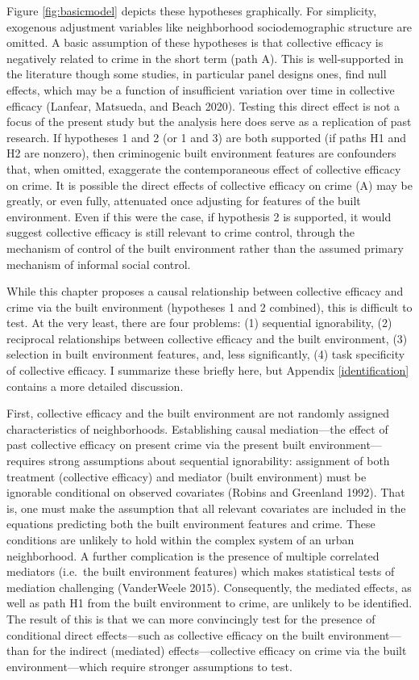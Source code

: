 \documentclass [11pt, proquest] {uwthesis}[2015/03/03]
\begin{document}
Figure \ref{fig:basicmodel} depicts these hypotheses graphically. For simplicity, exogenous adjustment variables like neighborhood sociodemographic structure are omitted. A basic assumption of these hypotheses is that collective efficacy is negatively related to crime in the short term (path A). This is well-supported in the literature though some studies, in particular panel designs ones, find null effects, which may be a function of insufficient variation over time in collective efficacy (Lanfear, Matsueda, and Beach 2020). Testing this direct effect is not a focus of the present study but the analysis here does serve as a replication of past research. If hypotheses 1 and 2 (or 1 and 3) are both supported (if paths H1 and H2 are nonzero), then criminogenic built environment features are confounders that, when omitted, exaggerate the contemporaneous effect of collective efficacy on crime. It is possible the direct effects of collective efficacy on crime (A) may be greatly, or even fully, attenuated once adjusting for features of the built environment. Even if this were the case, if hypothesis 2 is supported, it would suggest collective efficacy is still relevant to crime control, through the mechanism of control of the built environment rather than the assumed primary mechanism of informal social control.

While this chapter proposes a causal relationship between collective efficacy and crime via the built environment (hypotheses 1 and 2 combined), this is difficult to test. At the very least, there are four problems: (1) sequential ignorability, (2) reciprocal relationships between collective efficacy and the built environment, (3) selection in built environment features, and, less significantly, (4) task specificity of collective efficacy. I summarize these briefly here, but Appendix \ref{identification} contains a more detailed discussion.

First, collective efficacy and the built environment are not randomly assigned characteristics of neighborhoods. Establishing causal mediation---the effect of past collective efficacy on present crime via the present built environment---requires strong assumptions about sequential ignorability: assignment of both treatment (collective efficacy) and mediator (built environment) must be ignorable conditional on observed covariates (Robins and Greenland 1992). That is, one must make the assumption that all relevant covariates are included in the equations predicting both the built environment features and crime. These conditions are unlikely to hold within the complex system of an urban neighborhood. A further complication is the presence of multiple correlated mediators (i.e.~the built environment features) which makes statistical tests of mediation challenging (VanderWeele 2015). Consequently, the mediated effects, as well as path H1 from the built environment to crime, are unlikely to be identified. The result of this is that we can more convincingly test for the presence of conditional direct effects---such as collective efficacy on the built environment---than for the indirect (mediated) effects---collective efficacy on crime via the built environment---which require stronger assumptions to test.
\end{document}
